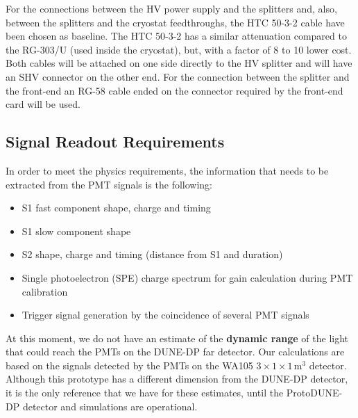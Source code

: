 For the connections between the HV power supply and the splitters and, also, between the splitters and the cryostat feedthroughs, the HTC 50-3-2 cable have been chosen as baseline. The HTC 50-3-2 has a similar attenuation compared to the RG-303/U (used inside the cryostat), but, with a factor of 8 to 10 lower cost. Both cables will be attached on one side directly to the HV splitter and will have an SHV connector on the other end. For the connection between the splitter and the front-end an RG-58 cable ended on the connector required by the front-end card will be used.

\subsection{Signal Readout Requirements}
\label{sec:fddp-pd-4.3}

In order to meet the physics requirements, the information that needs to be extracted from the PMT signals is the following:

\begin{itemize}
\item S1 fast component shape, charge and timing
\item S1 slow component shape
\item S2 shape, charge and timing (distance from S1 and duration)
\item Single photoelectron (SPE) charge spectrum for gain calculation during PMT calibration
\item Trigger signal generation by the coincidence of several PMT signals
\end{itemize}

At this moment, we do not have an estimate of the \textbf{dynamic range }of the light that could reach the PMTs on the DUNE-DP far detector. Our calculations are based on the signals detected by the PMTs on the WA105 $3\times1\times1$\,m$^3$ detector. Although this prototype has a different dimension from the DUNE-DP detector, it is the only reference that we have for these estimates, until the ProtoDUNE-DP detector and simulations are operational.

